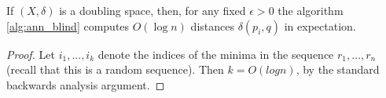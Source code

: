 \documentclass[a4paper,USenglish]{socg-lipics-v2018}
\newcommand{\eps}{\epsilon}
\newcommand{\dist}{\delta}
\begin{document}
\begin{algorithmic}






\begin{theorem}
    If $(X, \dist)$ is a doubling space, then, for any fixed $\eps > 0$ the
    algorithm \ref{alg:ann_blind} computes $O(\log n)$ distances $\dist(p_i, q)$ in expectation.
\end{theorem}

\begin{proof}
Let $i_1,...,i_k$ denote the indices of the minima in the sequence $r_1, \dots, r_n$
    (recall that this is a random sequence). Then $k=O(log n)$,
    by the standard backwards analysis argument.



\end{proof}
\end{algorithmic}
\end{document}
